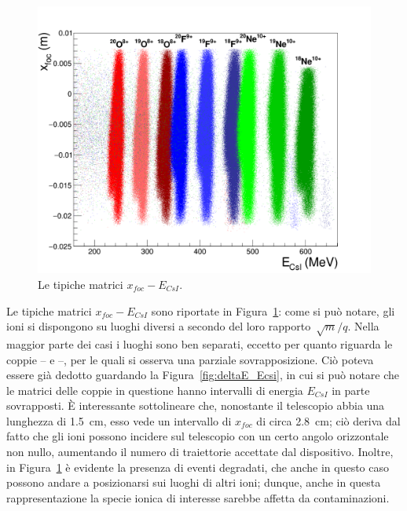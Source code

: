 \begin{figure} [!p]
	\centering
	\includegraphics[width=\textwidth, keepaspectratio]{Grafici_Tesi2/PID/xf_csi_label.png}
	\caption{Le tipiche matrici $x_{foc} - E_{CsI}$.} \label{fig:xf_Ecsi}
\end{figure}

Le tipiche matrici $x_{foc} - E_{CsI}$ sono riportate in Figura~\ref{fig:xf_Ecsi}: come si può notare, gli ioni si dispongono su luoghi diversi a secondo del loro rapporto~$\sqrt{m}/q$. 
Nella maggior parte dei casi i luoghi sono ben separati, eccetto per quanto riguarda le coppie -- e --, per le quali si osserva una parziale sovrapposizione.
Ciò poteva essere già dedotto guardando la Figura~\ref{fig:deltaE_Ecsi}, in cui si può notare che le matrici delle coppie in questione hanno intervalli di energia $E_{CsI}$ in parte sovrapposti.
È interessante sottolineare che, nonostante il telescopio abbia una lunghezza di 1.5~cm, esso vede un intervallo di $x_{foc}$ di circa 2.8~cm; ciò deriva dal fatto che gli ioni possono incidere sul telescopio con un certo angolo orizzontale non nullo, aumentando il numero di traiettorie accettate dal dispositivo.
Inoltre, in Figura~\ref{fig:xf_Ecsi} è evidente la presenza di eventi degradati, che anche in questo caso possono andare a posizionarsi sui luoghi di altri ioni; dunque, anche in questa rappresentazione la specie ionica di interesse sarebbe affetta da contaminazioni.

